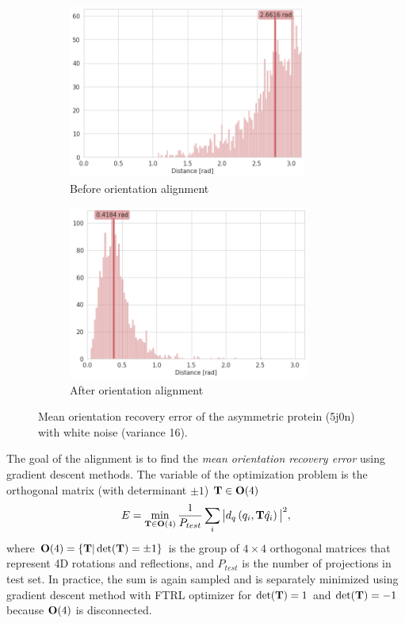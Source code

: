 \begin{figure}
    \centering
    \begin{subfigure}[b]{0.45\textwidth}
        \includegraphics[height=5.7cm]{images/5j0n_noise16_angle_alignment_before.png}
        \caption{Before orientation alignment}
    \end{subfigure}
    \hfill
    \begin{subfigure}[b]{0.5\textwidth}
    \centering
        \includegraphics[height=5.7cm]{images/5j0n_noise16_angle_alignment_after.png}
        \caption{After orientation alignment}
    \end{subfigure}
    \caption{
        Mean orientation recovery error of the asymmetric protein (5j0n) with white noise (variance 16).
}
    \label{fig:angle-alignment-5j0n-noise16}
\end{figure}

The goal of the alignment is to find the \textit{mean orientation recovery error} using gradient descent methods. The variable of the optimization problem is the orthogonal matrix (with determinant $\pm1$)   $\mathbf{T}\in\mathrm{\mathbf{O}}(4)$
\begin{equation}
    E = \min_{\mathbf{T} \in \mathrm{\mathbf{O}}(4)} \frac{1}{P_{test}} \sum_{i} \big| d_q\left(q_i,\mathbf{T}\hat{q_i}\right)\big|^2,
    \label{eqn:orientation-recovery-error}
\end{equation}
where $\mathrm{\mathbf{O}}(4) = \{\mathbf{T} | \det(\mathbf{T}) = \pm 1\}$ is the group of $4 \times 4$ orthogonal matrices that represent 4D rotations and reflections, and $P_{test}$ is the number of projections in test set.
In practice, the sum is again sampled and  is separately minimized using gradient descent method with FTRL optimizer \cite{TODO} for $\det(\mathbf{T}) = 1$ and $\det(\mathbf{T}) = -1$ because $\mathrm{\mathbf{O}}(4)$ is disconnected.


